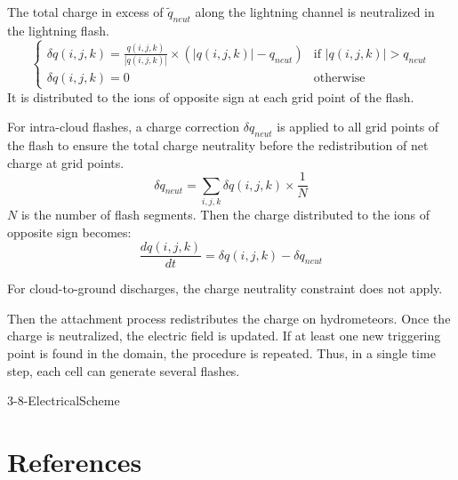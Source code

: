 The total charge in excess of $\tilde q_{neut}$ along the lightning channel is neutralized in the lightning flash.
\begin{equation}
  \left\{
  \begin{array}{ll}
    \delta q(i,j,k) = \frac{q(i,j,k)} {|q(i,j,k)|} \times \left( |q(i,j,k)| - q_{neut} \right) & \mbox{if } |q(i,j,k)| > q_{neut} \\
    \delta q(i,j,k) = 0 & \mbox{otherwise}
  \end{array}
  \right.
\end{equation}
It is distributed to the ions of opposite sign at each grid point of the flash. 

For intra-cloud flashes, a charge correction $\delta q_{neut}$ is applied to all grid points of the flash to ensure the total charge neutrality \citep{MacGorman-2001} before the redistribution of net charge at grid points. 
\begin{equation}
  \delta q_{neut} = \sum_{i,j,k} \delta q(i,j,k) \times \frac{1}{N}
\end{equation}
$N$ is the number of flash segments.
Then the charge distributed to the ions of opposite sign becomes:
\begin{equation}
  \frac{dq(i,j,k)}{dt} = \delta q(i,j,k) - \delta q_{neut}
\end{equation}

For cloud-to-ground discharges, the charge neutrality constraint does not apply.

Then the attachment process redistributes the charge on hydrometeors.
Once the charge is neutralized, the electric field is updated.
If at least one new triggering point is found in the domain, the procedure is repeated.
Thus, in a single time step, each cell can generate several flashes.


\begin{btSect}{3-8-ElectricalScheme}
\section{References}
\btPrintCited
\end{btSect}
